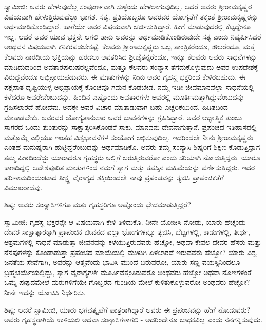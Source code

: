 ಸ್ವಾಮೀಜಿ: ಅವರು ಹೇಳುವುದೆಲ್ಲ ಸಂಪೂರ್ಣವಾಗಿ ಸುಳ್ಳೆಂದು ಹೇಳಲಾಗುವುದಿಲ್ಲ. ಆದರೆ ಅವರು ಶ‍್ರೀರಾಮಕೃಷ್ಣರ ವಿಷಯವಾಗಿ ಹೇಳುತ್ತಿರುವುದೆಲ್ಲಾ ಭಾಗಶಃ ಸತ್ಯ. ಪ್ರತಿಯೊಬ್ಬರೂ ಅವರವರ ಯೋಗ್ಯತೆಗೆ ತಕ್ಕಂತೆ ಶ‍್ರೀರಾಮಕೃಷ್ಣರನ್ನು ಅರ್ಥಮಾಡಿಕೊಂಡಿದ್ದಾರೆ. ಹಾಗೆಯೇ ಅವರ ವಿಷಯವಾಗಿ ಚರ್ಚಿಸುತ್ತಿದ್ದಾರೆ. ಹೀಗೆ ಮಾಡುವುದರಲ್ಲಿ ಕೆಟ್ಟದ್ದೇನೂ ಇಲ್ಲ. ಆದರೆ ಅವರ ಯಾವ ಭಕ್ತನೇ ಆಗಲಿ ತಾನು ಅವರನ್ನು ಅರ್ಥಮಾಡಿಕೊಂಡಿರುವುದೇ ಸತ್ಯ ಎಂದು ನಿಷ್ಕರ್ಷಿಸಿದರೆ ಅಂಥವನ ವಿಷಯವಾಗಿ ಕನಿಕರಪಡಬೇಕಷ್ಟೆ. ಕೆಲವರು ಶ‍್ರೀರಾಮಕೃಷ್ಣರು ಒಬ್ಬ ತಾಂತ್ರಿಕರೆಂದೂ, ಕೌಲರೆಂದೂ, ಮತ್ತೆ ಕೆಲವರು ನಾರದೀಯ ಭಕ್ತಿಯನ್ನು ಹರಡಲು ಅವತರಿಸಿದ ಶ‍್ರೀಚೈತನ್ಯರೆಂದೂ, ಇನ್ನೂ ಕೆಲವರು ಅವರು ಸಾಧನೆಗಳನ್ನು ಮಾಡಿದುದರಿಂದ ಅವತಾರಪುರುಷರಲ್ಲವೆಂದೂ, ಮತ್ತೂ ಕೆಲವರು ಸಂನ್ಯಾಸ ತೆಗೆದುಕೊಳ್ಳುವುದು ಅವರ ಉಪದೇಶಕ್ಕೆ ವಿರುದ್ದವೆಂದೂ ಅಭಿಪ್ರಾಯಪಡುವರು. ಈ ಮಾತುಗಳನ್ನು ನೀನು ಅವರ ಗೃಹಸ್ಥ ಭಕ್ತರಿಂದ ಕೇಳಿರಬಹುದು. ಈ ಪಕ್ಷಪಾತ ದೃಷ್ಟಿಯುಳ್ಳ ಅಭಿಪ್ರಾಯಕ್ಕೆ ಕೊಂಚವೂ ಗಮನ ಕೊಡಬೇಡ. ನಮ್ಮ ಇಡೀ ಜೀವಮಾನವೆಲ್ಲಾ ಸಾಧನೆಯಲ್ಲಿ ಕಳೆದರೂ ಅವರೇನೆಂಬುದನ್ನು, ಹಿಂದಿನ ಎಷ್ಟೊಂದು ಅವತಾರಗಳು ಅವರಲ್ಲಿ ಮೂರ್ತಿಮತ್ತಾಗಿದ್ದುವೆಂಬುದನ್ನು ಗ್ರಹಿಸಲಾರದೆ ಹೋದೆವು. ಅದಕ್ಕೇ ಅವರ ವಿಚಾರ ಮಾತಾಡುವಾಗ ಬಹು ಎಚ್ಚರಿಕೆಯಿಂದ, ಹಿಡಿತದಿಂದ ಮಾತಾಡಬೇಕು. ಅವರವರ ಯೋಗ್ಯತಾನುಸಾರ ಅವರ ಭಾವನೆಗಳನ್ನು ಗ್ರಹಿಸಿದ್ದಾರೆ. ಅವರ ಆಧ್ಯಾತ್ಮಿಕ ತುಂಬು ಸಾಗರದ ಒಂದು ತುಂತುರನ್ನು ಸಾಕ್ಷಾತ್ಕರಿಸಿಕೊಂಡರೆ ಸಾಕು, ಮಾನವನು ದೇವನಾಗುತ್ತಾನೆ. ಪ್ರಪಂಚದ ಇತಿಹಾಸದಲ್ಲಿ ಮತ್ತೊಮ್ಮೆ ಎಲ್ಲಿಯೂ ಇಂತಹ ವಿಶ್ವಭಾವನೆಗಳ ಸಂಯೋಗ ಲಭಿಸುವುದಿಲ್ಲ. ಇದರಿಂದಲೇ ನೀನು ಶ‍್ರೀರಾಮಕೃಷ್ಣರು ಎಂತಹ ಮನುಷ್ಯರಾಗಿ ಹುಟ್ಟಿದ್ದರೆಂಬುದನ್ನು ಅರ್ಥಮಾಡಿಕೊ. ಅವರು ತಮ್ಮ ಸಂನ್ಯಾಸಿ ಶಿಷ್ಯರಿಗೆ ಶಿಕ್ಷಣ ಕೊಡುತ್ತಿದ್ದಾಗ ತಮ್ಮ ಪೀಠದಿಂದೆದ್ದು ಯಾರಾದರೂ ಗೃಹಸ್ಥರು ಅಲ್ಲಿಗೆ ಬರುತ್ತಿರುವರೋ ಎಂದು ಸರಿಯಾಗಿ ನೋಡುತ್ತಿದ್ದರು. ಯಾರೂ ಕಾಣದಿದ್ದಲ್ಲಿ ಆವೇಶಪೂರಿತ ಮಾತುಗಳಿಂದ ನಮಗೆ ತ್ಯಾಗ ಮತ್ತು ತಪಸ್ಸಿನ ಮಹಿಮೆಯನ್ನು ವರ್ಣಿಸುತ್ತಿದ್ದರು. ಇದರ ಪರಿಣಾಮದಿಂದುಂಟಾದ ತೀಕ್ಷ್ಣ ವೈರಾಗ್ಯದ ಶಕ್ತಿಯಿಂದಲೇ ನಾವು ಪ್ರಪಂಚವನ್ನು ತ್ಯಜಿಸಿ ಪ್ರಾಪಂಚಿಕತೆಗೆ ವಿಮುಖರಾದೆವು.

ಶಿಷ್ಯ: ಅವರು ಸಂನ್ಯಾಸಿಗಳಿಗೂ ಮತ್ತು ಗೃಹಸ್ಥರಿಗೂ ಅಷ್ಟೊಂದು ಭೇದಮಾಡುತ್ತಿದ್ದರೆ?

ಸ್ವಾಮೀಜಿ: ಗೃಹಸ್ಥ ಭಕ್ತರನ್ನೇ ಆ ವಿಷಯವಾಗಿ ಕೇಳಿ ತಿಳಿದುಕೊ. ನೀನೇ ಯೋಚಿಸಿ ನೋಡು, ಯಾರು ಹೆಚ್ಚೆಂದು - ದೇವರ ಸಾಕ್ಷಾತ್ಕಾರಕ್ಕಾಗಿ ಪ್ರಾಪಂಚಿಕ ಜೀವನದ ಎಲ್ಲಾ ಭೋಗಗಳನ್ನೂ ತ್ಯಜಿಸಿ, ಬೆಟ್ಟಗಳಲ್ಲಿ, ಕಾಡುಗಳಲ್ಲಿ, ತೀರ್ಥ, ಆಶ್ರಮಗಳಲ್ಲಿ ಸಾಧನೆ ಮಾಡುತ್ತಾ ಜೀವನವನ್ನು ಕಳೆಯುತ್ತಿರುವವರು ಹೆಚ್ಚೋ, ಅಥವಾ ಕೇವಲ ದೇವರ ಹೆಸರು ಮತ್ತು ನೆನಪುಗಳನ್ನು ಕೊಂಡಾಡುತ್ತಾ ಪ್ರಪಂಚದ ಮಾಯೆಯಲ್ಲಿ ಮುಳುಗಿ ಏಳಲಾರದೆ ಇರುವವರು ಹೆಚ್ಚೋ? ಯಾರು ವಿಶ್ವ ಜನತೆಯ ಸೇವೆಗಾಗಿ, ಅವರನ್ನು ಆತ್ಮವೆಂದು ಭಾವಿಸಿ ಮುಂದೆ ಬರುವರೋ, ಯಾರು ಸಣ್ಣ ವಯಸ್ಸಿನಿಂದಲೂ ಬ್ರಹ್ಮಚರ್ಯೆಯಲ್ಲಿದ್ದು, ತ್ಯಾಗ ವೈರಾಗ್ಯಗಳೇ ಮೂರ್ತಿವೆತ್ತಂತಿರುವರೊ ಅಂಥವರು ಹೆಚ್ಚೋ ಅಥವಾ ನೊಣಗಳಂತೆ ಒಮ್ಮೆ ಪುಷ್ಪದಮೇಲೆ ಮರುಗಳಿಗೆಯೇ ಗೊಬ್ಬರದ ಗುಂಡಿಯ ಮೇಲೆ ಕುಳಿತುಕೊಳ್ಳುವರೋ ಅಂಥವರು ಹೆಚ್ಚೋ? ನೀನೇ ಇದನ್ನು ಯೋಚಿಸಿ ನಿರ್ಧರಿಸು.

ಶಿಷ್ಯ: ಆದರೆ ಸ್ವಾಮೀಜಿ, ಯಾರು ಭಗವತ್ಕೃಪೆಗೆ ಪಾತ್ರರಾಗಿದ್ದಾರೆ ಅವರು ಈ ಪ್ರಪಂಚವನ್ನು ಹೇಗೆ ನೋಡುವರು? ಅವರು ಗೃಹಸ್ಥರಾಗಿಯೆ ಉಳಿಯಲಿ ಅಥವಾ ಸಂನ್ಯಾಸಿಗಳಾಗಲಿ - ಅದರಿಂದೇನೂ ಬಾಧಕವಿಲ್ಲ ಎಂದು ನನಗನ್ನಿಸುವುದು.

